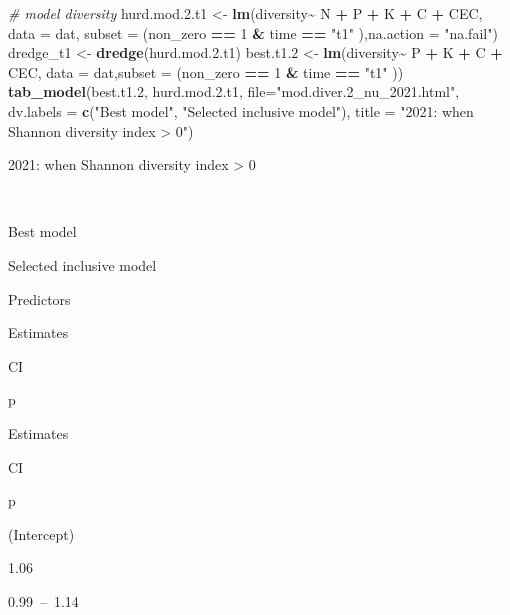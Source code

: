\documentclass[
]{article}
\newenvironment{Shaded}{\begin{snugshade}}{\end{snugshade}}
\newcommand{\AttributeTok}[1]{\textcolor[rgb]{0.13,0.29,0.53}{#1}}
\newcommand{\CommentTok}[1]{\textcolor[rgb]{0.56,0.35,0.01}{\textit{#1}}}
\newcommand{\DecValTok}[1]{\textcolor[rgb]{0.00,0.00,0.81}{#1}}
\newcommand{\FloatTok}[1]{\textcolor[rgb]{0.00,0.00,0.81}{#1}}
\newcommand{\FunctionTok}[1]{\textcolor[rgb]{0.13,0.29,0.53}{\textbf{#1}}}
\newcommand{\NormalTok}[1]{#1}
\newcommand{\OtherTok}[1]{\textcolor[rgb]{0.56,0.35,0.01}{#1}}
\newcommand{\SpecialCharTok}[1]{\textcolor[rgb]{0.81,0.36,0.00}{\textbf{#1}}}
\newcommand{\StringTok}[1]{\textcolor[rgb]{0.31,0.60,0.02}{#1}}
\begin{document}
\begin{Shaded}
\begin{Highlighting}[]
\CommentTok{\# model diversity}
\NormalTok{hurd.mod.}\FloatTok{2.}\NormalTok{t1 }\OtherTok{\textless{}{-}} \FunctionTok{lm}\NormalTok{(diversity}\SpecialCharTok{\textasciitilde{}}\NormalTok{ N }\SpecialCharTok{+}\NormalTok{ P }\SpecialCharTok{+}\NormalTok{ K }\SpecialCharTok{+}\NormalTok{ C }\SpecialCharTok{+}\NormalTok{ CEC, }\AttributeTok{data =}\NormalTok{ dat, }\AttributeTok{subset =}\NormalTok{ (non\_zero }\SpecialCharTok{==} \DecValTok{1} \SpecialCharTok{\&}\NormalTok{ time }\SpecialCharTok{==} \StringTok{"t1"}\NormalTok{ ),}\AttributeTok{na.action =} \StringTok{"na.fail"}\NormalTok{)}
\NormalTok{dredge\_t1 }\OtherTok{\textless{}{-}} \FunctionTok{dredge}\NormalTok{(hurd.mod.}\FloatTok{2.}\NormalTok{t1)}
\NormalTok{best.t1}\FloatTok{.2} \OtherTok{\textless{}{-}} \FunctionTok{lm}\NormalTok{(diversity}\SpecialCharTok{\textasciitilde{}}\NormalTok{  P }\SpecialCharTok{+}\NormalTok{ K }\SpecialCharTok{+}\NormalTok{ C }\SpecialCharTok{+}\NormalTok{ CEC, }\AttributeTok{data =}\NormalTok{ dat,}\AttributeTok{subset =}\NormalTok{ (non\_zero }\SpecialCharTok{==} \DecValTok{1} \SpecialCharTok{\&}\NormalTok{ time }\SpecialCharTok{==} \StringTok{"t1"}\NormalTok{ ))}
\FunctionTok{tab\_model}\NormalTok{(best.t1}\FloatTok{.2}\NormalTok{, hurd.mod.}\FloatTok{2.}\NormalTok{t1, }\AttributeTok{file=}\StringTok{"mod.diver.2\_nu\_2021.html"}\NormalTok{, }\AttributeTok{dv.labels =} \FunctionTok{c}\NormalTok{(}\StringTok{"Best model"}\NormalTok{, }\StringTok{"Selected inclusive model"}\NormalTok{), }\AttributeTok{title =} \StringTok{"2021: when Shannon diversity index \textgreater{} 0"}\NormalTok{)}
\end{Highlighting}
\end{Shaded}

2021: when Shannon diversity index \textgreater{} 0

~

Best model

Selected inclusive model

Predictors

Estimates

CI

p

Estimates

CI

p

(Intercept)

1.06

0.99~--~1.14
\end{document}
